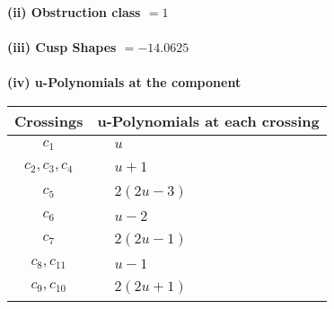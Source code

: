 \documentclass[1p]{elsarticle_modified}
\theoremstyle{definition}
\begin{document}
\flushleft \textbf{(ii) Obstruction class $= 1$}\\~\\
\flushleft \textbf{(iii) Cusp Shapes $= -14.0625$}\\~\\
\newpage\renewcommand{\arraystretch}{1}
\flushleft \textbf{(iv) u-Polynomials at the component}\newline \\
\begin{tabular}{m{50pt}|m{274pt}}
Crossings & \hspace{64pt}u-Polynomials at each crossing \\
\hline $$\begin{aligned}c_{1}\end{aligned}$$&$\begin{aligned}
&u
\end{aligned}$\\
\hline $$\begin{aligned}c_{2},c_{3},c_{4}\end{aligned}$$&$\begin{aligned}
&u+1
\end{aligned}$\\
\hline $$\begin{aligned}c_{5}\end{aligned}$$&$\begin{aligned}
&2(2 u-3)
\end{aligned}$\\
\hline $$\begin{aligned}c_{6}\end{aligned}$$&$\begin{aligned}
&u-2
\end{aligned}$\\
\hline $$\begin{aligned}c_{7}\end{aligned}$$&$\begin{aligned}
&2(2 u-1)
\end{aligned}$\\
\hline $$\begin{aligned}c_{8},c_{11}\end{aligned}$$&$\begin{aligned}
&u-1
\end{aligned}$\\
\hline $$\begin{aligned}c_{9},c_{10}\end{aligned}$$&$\begin{aligned}
&2(2 u+1)
\end{aligned}$\\
\hline
\end{tabular}\\~\\
\end{document}
